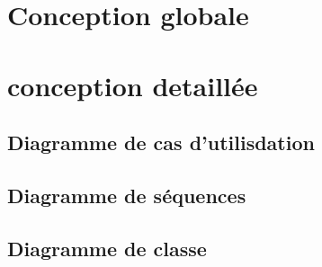 \section{Conception globale}
\lipsum[2-2]
\section{conception detaillée}
\lipsum[2-2]
\subsection{Diagramme de cas d'utilisdation}
\lipsum[1-1]

\lipsum[2-2]
\subsection{Diagramme de séquences}
\lipsum[2-2]
\subsection{Diagramme de classe}
\lipsum[2-2]
